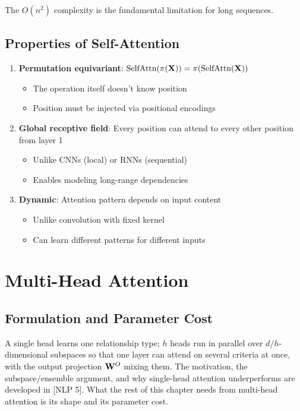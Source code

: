 The $O(n^2)$ complexity is the fundamental limitation for long sequences.

\subsection{Properties of Self-Attention}

\begin{enumerate}
    \item \textbf{Permutation equivariant}: $\text{SelfAttn}(\pi(\mathbf{X})) = \pi(\text{SelfAttn}(\mathbf{X}))$
    \begin{itemize}
        \item The operation itself doesn't know position
        \item Position must be injected via positional encodings
    \end{itemize}

    \item \textbf{Global receptive field}: Every position can attend to every other position from layer 1
    \begin{itemize}
        \item Unlike CNNs (local) or RNNs (sequential)
        \item Enables modeling long-range dependencies
    \end{itemize}

    \item \textbf{Dynamic}: Attention pattern depends on input content
    \begin{itemize}
        \item Unlike convolution with fixed kernel
        \item Can learn different patterns for different inputs
    \end{itemize}
\end{enumerate}

\section{Multi-Head Attention}
\label{sec:multi_head}

\subsection{Formulation and Parameter Cost}

A single head learns one relationship type; $h$ heads run in parallel over $d/h$-dimensional subspaces so that one layer can attend on several criteria at once, with the output projection $\mathbf{W}^O$ mixing them. The motivation, the subspace/ensemble argument, and why single-head attention underperforms are developed in [NLP 5]. What the rest of this chapter needs from multi-head attention is its shape and its parameter cost.


